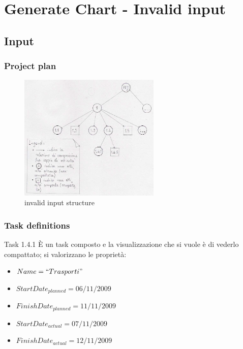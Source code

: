 \chapter{Generate Chart - Invalid input}
\label{chap:genChartInvInput}

\section{Input}
\label{sec:generateGanttInvalidInput}
\subsection{Project plan}
\begin{figure}[h!] 
\centering
\includegraphics[width=0.6\textwidth]{case_spec/generate_Gantt/invalidInput.png}
\caption{invalid input structure}
\end{figure}

\subsection{Task definitions}
\begin{taksDef}{Task 1.4.1} \`E un task composto e la visualizzazione che si
vuole \`e di vederlo compattato; si valorizzano le propriet\`a:
\begin{itemize}
  \item $Name = ``Trasporti"$
  \item $StartDate_{planned} = 06/11/2009$
  \item $FinishDate_{planned} = 11/11/2009$
  \item $StartDate_{actual} = 07/11/2009$
  \item $FinishDate_{actual} = 12/11/2009$
\end{itemize}
\end{taksDef}

